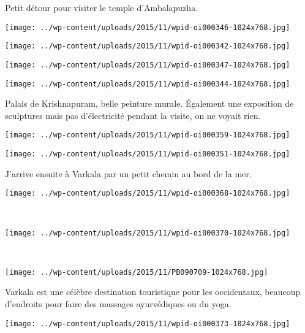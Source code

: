  Petit détour pour visiter le temple d'Ambalapuzha. 
\begin{center} \texttt{[image: ../wp-content/uploads/2015/11/wpid-oi000346-1024x768.jpg]} \end{center}
\begin{center} \texttt{[image: ../wp-content/uploads/2015/11/wpid-oi000342-1024x768.jpg]} \end{center}
\begin{center} \texttt{[image: ../wp-content/uploads/2015/11/wpid-oi000347-1024x768.jpg]} \end{center}
\begin{center} \texttt{[image: ../wp-content/uploads/2015/11/wpid-oi000344-1024x768.jpg]} \end{center}

 Palais de Krishnapuram, belle peinture murale. Également une exposition de sculptures mais pas d'électricité pendant la visite, on ne voyait rien. 
\begin{center} \texttt{[image: ../wp-content/uploads/2015/11/wpid-oi000359-1024x768.jpg]} \end{center}
\begin{center} \texttt{[image: ../wp-content/uploads/2015/11/wpid-oi000351-1024x768.jpg]} \end{center}

 J'arrive ensuite à Varkala par un petit chemin au bord de la mer. 
\begin{center} \texttt{[image: ../wp-content/uploads/2015/11/wpid-oi000368-1024x768.jpg]} \end{center}
\vspace{-\topsep}
\pagebreak

~\\
\vspace{0.5mm}
\begin{center} \texttt{[image: ../wp-content/uploads/2015/11/wpid-oi000370-1024x768.jpg]} \end{center}
~
\begin{center} \texttt{[image: ../wp-content/uploads/2015/11/PB090709-1024x768.jpg]} \end{center}
\vspace{-\topsep}
\pagebreak

  Varkala est une célèbre destination touristique pour les occidentaux, beaucoup d'endroits pour faire des massages ayurvédiques ou du yoga. 
\begin{center} \texttt{[image: ../wp-content/uploads/2015/11/wpid-oi000373-1024x768.jpg]} \end{center}

